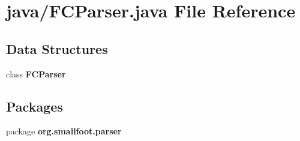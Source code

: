 \section{java/\-F\-C\-Parser.java File Reference}
\label{FCParser_8java}
\subsection*{Data Structures}
\begin{DoxyCompactItemize}
\item 
class {\bf F\-C\-Parser}
\end{DoxyCompactItemize}
\subsection*{Packages}
\begin{DoxyCompactItemize}
\item 
package {\bf org.\-smallfoot.\-parser}
\end{DoxyCompactItemize}
